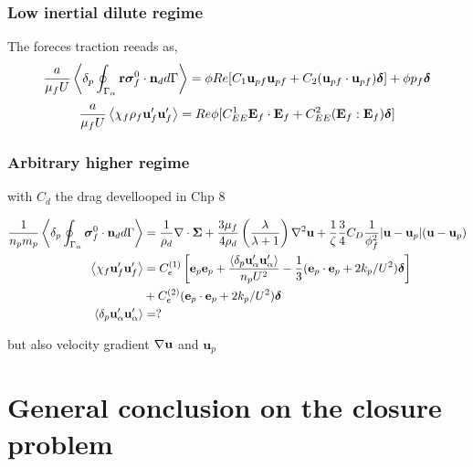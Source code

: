 \subsubsection{Low inertial dilute regime}
The foreces traction reeads as, 
\begin{equation}
    \frac{a}{\mu_f U}\left<\delta_p \oint_{\Gamma_{\alpha}} \textbf{r}\bm{\sigma}_f^0 \cdot \textbf{n}_d d\Gamma\right>
    =
     \phi Re [C_1
    \textbf{u}_{pf}\textbf{u}_{pf} 
    + C_2 (\textbf{u}_{pf}\cdot \textbf{u}_{pf}) \bm\delta]
    + \phi p_f \bm\delta
\end{equation}
\begin{equation}
    \frac{a }{\mu_f U}\left<\chi_f\rho_f \textbf{u}_f'\textbf{u}_f'\right> =  Re \phi [
        C_{EE}^1 \textbf{E}_f\cdot \textbf{E}_f
       + C_{EE}^2 (\textbf{E}_f : \textbf{E}_f)\bm\delta
    ]
\end{equation}


\subsubsection{Arbitrary higher regime}
with $C_d$ the drag devellooped in Chp 8

\begin{align*}
    \frac{1}{n_pm_p}\left<\delta_p \oint_{\Gamma_{\alpha}} \bm{\sigma}_f^0\cdot \textbf{n}_d d\Gamma\right> &= 
    \frac{1}{\rho_d} \mathbf{\nabla}\cdot\bm\Sigma
    + \frac{3\mu_f}{4\rho_d} \left(\frac{\lambda}{\lambda+1}\right)\mathbf{\nabla}^2\textbf{u} 
    + \frac{1}{\zeta} \frac{3}{4} C_D\frac{1}{\phi_f^2} |\textbf{u}- \textbf{u}_p|(\textbf{u}- \textbf{u}_p)\\
    \left<\chi_f \textbf{u}_f'\textbf{u}_f'\right>
    &= C^{(1)}_e \left[
        \textbf{e}_p\textbf{e}_p
        + \frac{\left<\delta_p \textbf{u}_\alpha'\textbf{u}_\alpha'\right>}{n_p U^2}
         - \frac{1}{3}(\textbf{e}_p\cdot \textbf{e}_p+2k_p/U^2)\bm\delta
    \right]\\
    &+ C^{(2)}_e 
    (\textbf{e}_p\cdot \textbf{e}_p+2k_p/U^2)\bm\delta \\
    \left<\delta_p \textbf{u}_\alpha'\textbf{u}_\alpha'\right> &= ?
\end{align*}


but also velocity gradient $\mathbf{\nabla} \textbf{u}$  and $\textbf{u}_p$

\section{General conclusion on the closure problem}

